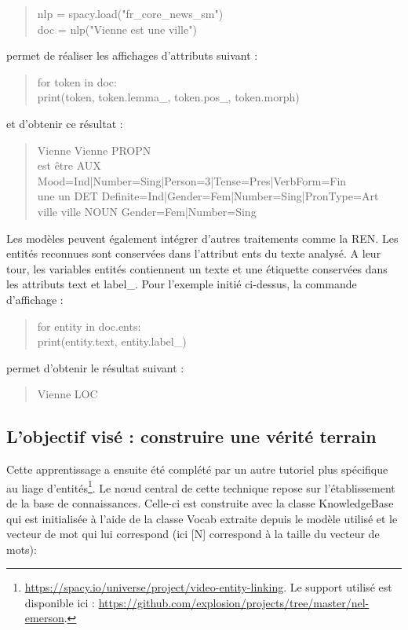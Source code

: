 \documentclass[a4paper,12pt,twoside]{book}
\begin{document}
	\begin{quotation}
		nlp = spacy.load("fr\_core\_news\_sm")\\
		\indent doc = nlp("Vienne est une ville")
	\end{quotation}

	\noindent permet de réaliser les affichages d'attributs suivant :
	
	\begin{quotation}
		for token in doc:\\
		\indent \indent print(token, token.lemma\_, token.pos\_, token.morph)
	\end{quotation}

	\noindent et d'obtenir ce résultat :
	
	\begin{quotation}
		Vienne Vienne PROPN \\
		\indent est être AUX Mood=Ind|Number=Sing|Person=3|Tense=Pres|VerbForm=Fin\\
		\indent une un DET Definite=Ind|Gender=Fem|Number=Sing|PronType=Art\\
		\indent ville ville NOUN Gender=Fem|Number=Sing\\
	\end{quotation}
	
	\noindent Les modèles peuvent également intégrer d'autres traitements comme la REN. Les entités reconnues sont conservées dans l'attribut \og ents\fg{} du texte analysé. A leur tour, les variables entités contiennent un texte et une étiquette conservées dans les attributs \og text\fg{} et \og label\_\fg{}. Pour l'exemple initié ci-dessus, la commande d'affichage :
	
	\begin{quotation}
		for entity in doc.ents:\\
		\indent \indent print(entity.text, entity.label\_)
	\end{quotation}

	\noindent permet d'obtenir le résultat suivant :
	
	\begin{quotation}
		Vienne LOC
	\end{quotation}
	
	\subsection{L'objectif visé : construire une vérité terrain}
	
	Cette apprentissage a ensuite été complété par un autre tutoriel plus spécifique au liage d'entités\footnote{\url{https://spacy.io/universe/project/video-entity-linking}. Le support utilisé est disponible ici : \url{https://github.com/explosion/projects/tree/master/nel-emerson}.}. Le nœud central de cette technique repose sur l'établissement de la base de connaissances. Celle-ci est construite avec la classe \og KnowledgeBase\fg{} qui est initialisée à l'aide de la classe \og Vocab\fg{} extraite depuis le modèle utilisé et le vecteur de mot qui lui correspond (ici [N] correspond à la taille du vecteur de mots):
	
\end{document}
